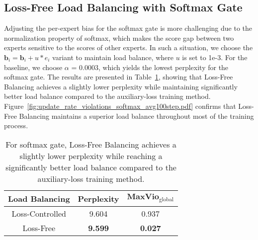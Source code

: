 \documentclass{article} %
\newcommand{\ours}{Loss-Free Balancing}
\begin{document}



\subsection{Loss-Free Load Balancing with Softmax Gate}
Adjusting the per-expert bias for the softmax gate is more challenging due to the normalization property of softmax, which makes the score gap between two experts sensitive to the scores of other experts. In such a situation, we choose the $\mathbf b_i = \mathbf b_i + u*e_i$ variant to maintain load balance, where $u$ is set to 1e-3. For the baseline, we choose $\alpha$ = 0.0003, which yields the lowest perplexity for the softmax gate. The results are presented in Table~\ref{tab:softmax_results}, showing that \ours{} achieves a slightly lower perplexity while maintaining significantly better load balance compared to the auxiliary-loss training method. Figure~\ref{fig:update_rate_violations_softmax_avg100step.pdf} confirms that \ours{} maintains a superior load balance throughout most of the training process.

\begin{table}[t]
\caption{For softmax gate, \ours{} achieves a slightly lower perplexity while reaching a significantly better load balance compared to the auxiliary-loss training method. }
\label{tab:softmax_results}
\begin{center}
\begin{tabular}{c|cc}
\toprule
\textbf{Load Balancing} & \textbf{Perplexity} &  $\textbf{MaxVio}_\text{global}$\\
\midrule
Loss-Controlled & 9.604 & 0.937 \\
Loss-Free & \textbf{9.599} & \textbf{0.027} \\ 
\bottomrule
\end{tabular}
\end{center}
\end{table}
\end{document}
